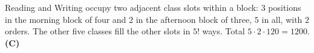 Reading and Writing occupy two adjacent class slots within a block: $3$ positions in the morning block of four and $2$ in the afternoon block of three, $5$ in all, with $2$ orders. The other five classes fill the other slots in $5!$ ways. Total $5\cdot2\cdot120=1200$. \textbf{(C)}
